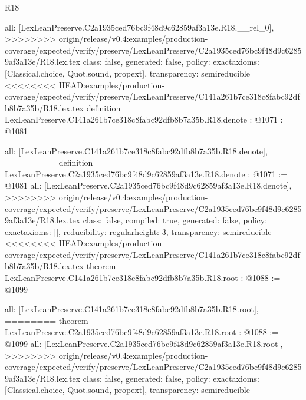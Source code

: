 \begin{lexlean}{R18}
\begin{coremodule}
{{{{{{{{{{{{  all: [LexLeanPreserve.C2a1935ced76bc9f48d9c62859af3a13e.R18.__rel_0],
>>>>>>>> origin/release/v0.4:examples/production-coverage/expected/verify/preserve/LexLeanPreserve/C2a1935ced76bc9f48d9c62859af3a13e/R18.lex.tex
  class: false,
  generated: false,
  policy: exact{axioms: [Classical.choice, Quot.sound, propext]},
  transparency: semireducible
}
<<<<<<<< HEAD:examples/production-coverage/expected/verify/preserve/LexLeanPreserve/C141a261b7ce318c8fabc92dfb8b7a35b/R18.lex.tex
definition LexLeanPreserve.C141a261b7ce318c8fabc92dfb8b7a35b.R18.denote : @1071 := @1081 {
  all: [LexLeanPreserve.C141a261b7ce318c8fabc92dfb8b7a35b.R18.denote],
========
definition LexLeanPreserve.C2a1935ced76bc9f48d9c62859af3a13e.R18.denote : @1071 := @1081 {
  all: [LexLeanPreserve.C2a1935ced76bc9f48d9c62859af3a13e.R18.denote],
>>>>>>>> origin/release/v0.4:examples/production-coverage/expected/verify/preserve/LexLeanPreserve/C2a1935ced76bc9f48d9c62859af3a13e/R18.lex.tex
  class: false,
  compiled: true,
  generated: false,
  policy: exact{axioms: []},
  reducibility: regular{height: 3},
  transparency: semireducible
}
<<<<<<<< HEAD:examples/production-coverage/expected/verify/preserve/LexLeanPreserve/C141a261b7ce318c8fabc92dfb8b7a35b/R18.lex.tex
theorem LexLeanPreserve.C141a261b7ce318c8fabc92dfb8b7a35b.R18.root : @1088 := @1099 {
  all: [LexLeanPreserve.C141a261b7ce318c8fabc92dfb8b7a35b.R18.root],
========
theorem LexLeanPreserve.C2a1935ced76bc9f48d9c62859af3a13e.R18.root : @1088 := @1099 {
  all: [LexLeanPreserve.C2a1935ced76bc9f48d9c62859af3a13e.R18.root],
>>>>>>>> origin/release/v0.4:examples/production-coverage/expected/verify/preserve/LexLeanPreserve/C2a1935ced76bc9f48d9c62859af3a13e/R18.lex.tex
  class: false,
  generated: false,
  policy: exact{axioms: [Classical.choice, Quot.sound, propext]},
  transparency: semireducible
}

}}}}}}}}}}}}}
\end{coremodule}
\end{lexlean}
